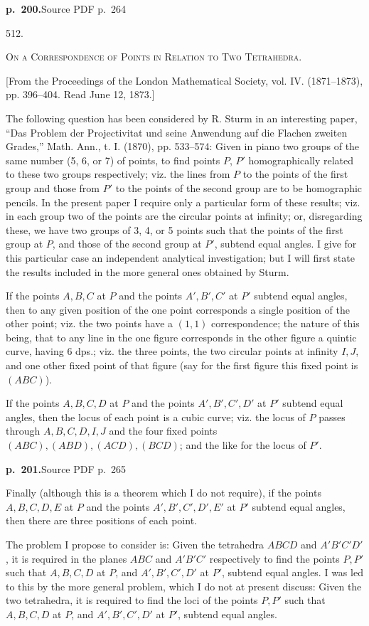 \documentclass[11pt,a4paper]{article}
\newcommand{\sourcepage}[2]{\par\bigskip\noindent\textbf{p.~#1.}\hfill{\footnotesize Source PDF p.~#2}\par\nobreak\medskip}
\newcommand{\articleno}[1]{\begin{center}\large #1.\end{center}}
\newcommand{\paperhead}[1]{\begin{center}\scshape #1\end{center}}
\newcommand{\journalnote}[1]{\begin{center}\small #1\end{center}}
\newcommand{\dps}{dps.}
\begin{document}
\clearpage
\sourcepage{200}{264}
\articleno{512}
\paperhead{On a Correspondence of Points in Relation to Two Tetrahedra.}
\journalnote{[From the Proceedings of the London Mathematical Society, vol. IV. (1871--1873), pp. 396--404. Read June 12, 1873.]}

The following question has been considered by R. Sturm in an interesting paper, ``Das Problem der Projectivitat und seine Anwendung auf die Flachen zweiten Grades,'' Math. Ann., t. I. (1870), pp. 533--574: Given in piano two groups of the same number (5, 6, or 7) of points, to find points $P$, $P'$ homographically related to these two groups respectively; viz. the lines from $P$ to the points of the first group and those from $P'$ to the points of the second group are to be homographic pencils. In the present paper I require only a particular form of these results; viz. in each group two of the points are the circular points at infinity; or, disregarding these, we have two groups of 3, 4, or 5 points such that the points of the first group at $P$, and those of the second group at $P'$, subtend equal angles. I give for this particular case an independent analytical investigation; but I will first state the results included in the more general ones obtained by Sturm.

If the points $A,B,C$ at $P$ and the points $A',B',C'$ at $P'$ subtend equal angles, then to any given position of the one point corresponds a single position of the other point; viz. the two points have a $(1,1)$ correspondence; the nature of this being, that to any line in the one figure corresponds in the other figure a quintic curve, having 6 \dps; viz. the three points, the two circular points at infinity $I,J$, and one other fixed point of that figure (say for the first figure this fixed point is $(ABC)$).

If the points $A,B,C,D$ at $P$ and the points $A',B',C',D'$ at $P'$ subtend equal angles, then the locus of each point is a cubic curve; viz. the locus of $P$ passes through $A,B,C,D,I,J$ and the four fixed points $(ABC),(ABD),(ACD),(BCD)$; and the like for the locus of $P'$.

\sourcepage{201}{265}
Finally (although this is a theorem which I do not require), if the points $A,B,C,D,E$ at $P$ and the points $A',B',C',D',E'$ at $P'$ subtend equal angles, then there are three positions of each point.

The problem I propose to consider is: Given the tetrahedra $ABCD$ and $A'B'C'D'$, it is required in the planes $ABC$ and $A'B'C'$ respectively to find the points $P,P'$ such that $A,B,C,D$ at $P$, and $A',B',C',D'$ at $P'$, subtend equal angles. I was led to this by the more general problem, which I do not at present discuss: Given the two tetrahedra, it is required to find the loci of the points $P,P'$ such that $A,B,C,D$ at $P$, and $A',B',C',D'$ at $P'$, subtend equal angles.
\end{document}
